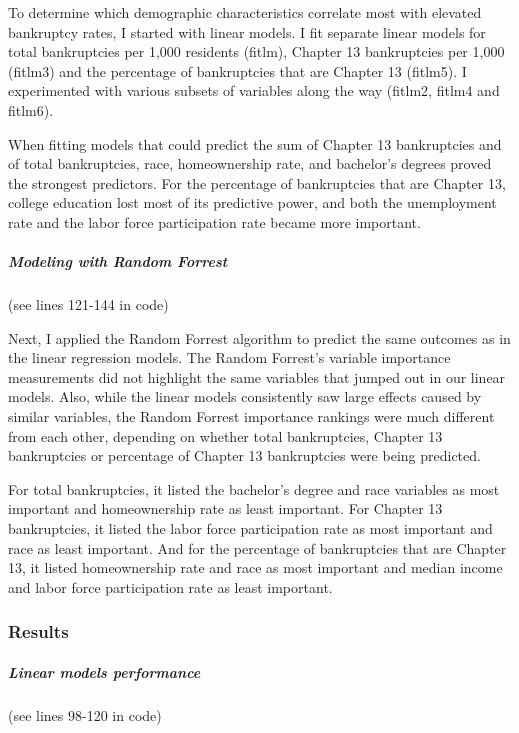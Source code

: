 \documentclass[
]{article}
\begin{document}
To determine which demographic characteristics correlate most with
elevated bankruptcy rates, I started with linear models. I fit separate
linear models for total bankruptcies per 1,000 residents (fitlm),
Chapter 13 bankruptcies per 1,000 (fitlm3) and the percentage of
bankruptcies that are Chapter 13 (fitlm5). I experimented with various
subsets of variables along the way (fitlm2, fitlm4 and fitlm6).

When fitting models that could predict the sum of Chapter 13
bankruptcies and of total bankruptcies, race, homeownership rate, and
bachelor's degrees proved the strongest predictors. For the percentage
of bankruptcies that are Chapter 13, college education lost most of its
predictive power, and both the unemployment rate and the labor force
participation rate became more important.

\hypertarget{modeling-with-random-forrest}{%
\subparagraph{Modeling with Random
Forrest}\label{modeling-with-random-forrest}}

(see lines 121-144 in code)

Next, I applied the Random Forrest algorithm to predict the same
outcomes as in the linear regression models. The Random Forrest's
variable importance measurements did not highlight the same variables
that jumped out in our linear models. Also, while the linear models
consistently saw large effects caused by similar variables, the Random
Forrest importance rankings were much different from each other,
depending on whether total bankruptcies, Chapter 13 bankruptcies or
percentage of Chapter 13 bankruptcies were being predicted.

For total bankruptcies, it listed the bachelor's degree and race
variables as most important and homeownership rate as least important.
For Chapter 13 bankruptcies, it listed the labor force participation
rate as most important and race as least important. And for the
percentage of bankruptcies that are Chapter 13, it listed homeownership
rate and race as most important and median income and labor force
participation rate as least important.

\hypertarget{results}{%
\subsubsection{Results}\label{results}}

\hypertarget{linear-models-performance}{%
\subparagraph{Linear models
performance}\label{linear-models-performance}}

(see lines 98-120 in code)
\end{document}
